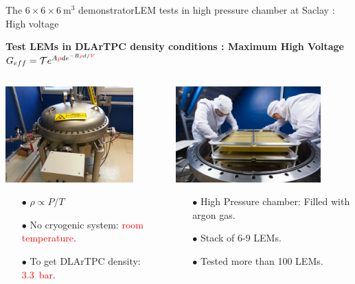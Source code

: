 \documentclass[10pt]{beamer}
\begin{document}
    \begin{frame}{The \texorpdfstring{$6 \times 6 \times \SI{6}{\meter\cubed}$}{666} demonstrator}{LEM tests in high pressure chamber at Saclay : High voltage}
    	\begin{scriptsize}
    		\begin{center}
    			\textbf{Test LEMs in DLArTPC density conditions : Maximum High Voltage}\\
    			$G _{eff}= \mathcal{T}e^{A\textcolor{red}{\rho} d e^{-B\textcolor{red}{\rho}d/\textcolor{red}{V}}}$
    		\end{center} 
    		\begin{columns}
		    	\begin{column}{0.5\textwidth}
		    		\includegraphics[height=3.7cm]{figures/666/gamelle.jpg}\\
		    		\begin{itemize}
		    			\item[$\bullet$] $\rho \propto P/T$
		    			\item[$\bullet$] No cryogenic system: \textcolor{red}{room temperature}.
		    			\item[$\bullet$] To get DLArTPC density: \textcolor{red}{\SI{3.3}{\bar}}.
		    		\end{itemize}
		    	\end{column}\hfill
		    	\begin{column}{0.5\textwidth}
		    		\includegraphics[height=3.7cm]{figures/666/6lems_gamelle.jpg}\\
		    		\begin{itemize}
		    			\item[$\bullet$] High Pressure chamber: Filled with argon gas.
		    			\item[$\bullet$] Stack of 6-9 LEMs.
		    			\item[$\bullet$] Tested more than 100 LEMs.
		    		\end{itemize}
		    	\end{column}
		    \end{columns}
	    \end{scriptsize} 
    \end{frame}
    
\end{document}
